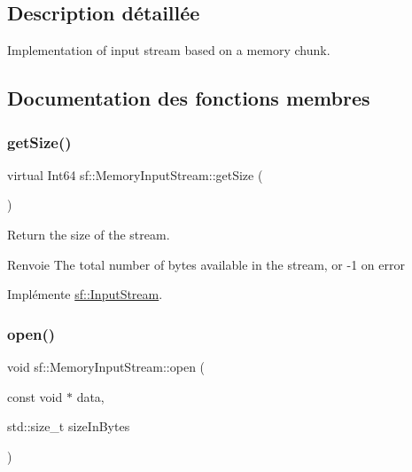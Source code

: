 \subsection{Description détaillée}
Implementation of input stream based on a memory chunk. 

\subsection{Documentation des fonctions membres}
\mbox{\label{classsf_1_1MemoryInputStream_a6ade3ca45de361ffa0a718595f0b6763}} 
\subsubsection{\texorpdfstring{get\+Size()}{getSize()}}
{\footnotesize\ttfamily virtual Int64 sf\+::\+Memory\+Input\+Stream\+::get\+Size (\begin{DoxyParamCaption}{ }\end{DoxyParamCaption})\hspace{0.3cm}{\ttfamily [virtual]}}



Return the size of the stream. 

\begin{DoxyReturn}{Renvoie}
The total number of bytes available in the stream, or -\/1 on error 
\end{DoxyReturn}


Implémente \hyperlink{classsf_1_1InputStream_a311eaaaa65d636728e5153b574b72d5d}{sf\+::\+Input\+Stream}.

\mbox{\label{classsf_1_1MemoryInputStream_ad3cfb4f4f915f7803d6a0784e394ac19}} 
\subsubsection{\texorpdfstring{open()}{open()}}
{\footnotesize\ttfamily void sf\+::\+Memory\+Input\+Stream\+::open (\begin{DoxyParamCaption}\item[{const void $\ast$}]{data,  }\item[{std\+::size\+\_\+t}]{size\+In\+Bytes }\end{DoxyParamCaption})}



